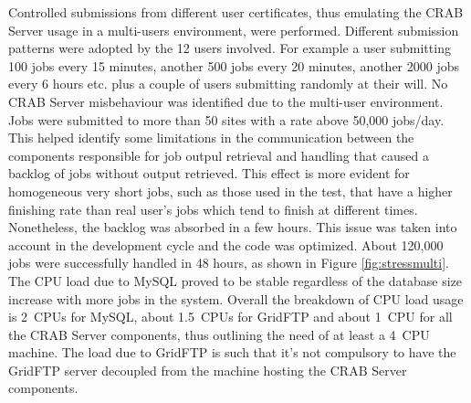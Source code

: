 Controlled submissions from different user certificates, thus 
emulating the CRAB Server usage in a multi-users environment, were performed.
Different submission patterns were adopted by the 12 users
involved. For example a user submitting 100 jobs every 15 minutes,
another 500 jobs every 20 minutes, another 2000 jobs every 6 hours
etc. plus a couple of users submitting randomly at their will.  No
CRAB Server misbehaviour was identified due to the multi-user
environment. %
Jobs were submitted to more than 50 sites with a rate above 50,000 jobs/day.
This helped identify some limitations in the communication between 
the components responsible for job outpul retrieval and handling that caused a backlog of jobs without output retrieved. This effect is more evident for homogeneous very short
jobs, such as those used in the test, that have a higher finishing rate
than real user's jobs which tend to finish at different times. Nonetheless, the backlog was absorbed in a few hours. This issue was
taken into account in the development cycle and the code was
optimized.  About 120,000 jobs were successfully handled in 48 hours,
as shown in Figure \ref{fig:stressmulti}.  The CPU load due to MySQL
proved to be stable regardless of the database size increase with more
jobs in the system. Overall the breakdown of CPU load usage is 2~CPUs
for MySQL, about 1.5~CPUs for GridFTP and about 1~CPU for all the CRAB
Server components, thus outlining the need of at least a 4~CPU
machine.  The load due to GridFTP is such that it's not compulsory to
have the GridFTP server decoupled from the machine hosting the CRAB
Server components.

